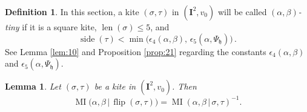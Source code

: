 \documentclass[10pt, a4paper]{amsart}
\newtheorem{lem}[equation]{Lemma}
\theoremstyle{definition}
\newtheorem{dfn}[equation]{Definition}
\numberwithin{equation}{section}
\newcommand{\opn}{\operatorname}
\newcommand{\mfrak}[1]{\mathfrak{#1}}
\newcommand{\mbf}[1]{\mathbf{#1}}
\renewcommand{\vert}{\, | \,}
\newcommand{\h}{\mfrak{h}}
\begin{document}
\begin{dfn}
In this section, a kite $(\sigma, \tau)$ in $(\mbf{I}^2, v_0)$ will be called 
{\em $(\alpha, \beta)$-tiny} if it is a square kite, 
$\opn{len}(\sigma) \leq 5$,
and
\[ \opn{side}(\tau) < \min \bigl( \epsilon_4(\alpha, \beta), \,
\epsilon_5(\alpha, \Psi_{\h}) \bigr) \, . \]
See Lemma \ref{lem:10} and Proposition \ref{prop:21} regarding the constants 
$\epsilon_4(\alpha, \beta)$ and $\epsilon_5(\alpha, \Psi_{\h})$.
\end{dfn}

\begin{lem} \label{lem:14}
Let $(\sigma, \tau)$ be a kite in $(\mbf{I}^2, v_0)$. Then
\begin{equation} \label{eqn:184}
\opn{MI} \bigl( \alpha, \beta \vert \opn{flip}(\sigma, \tau) \bigr) =
\opn{MI} (\alpha, \beta \vert \sigma, \tau)^{-1} .
\end{equation}
\end{lem}
\end{document}
